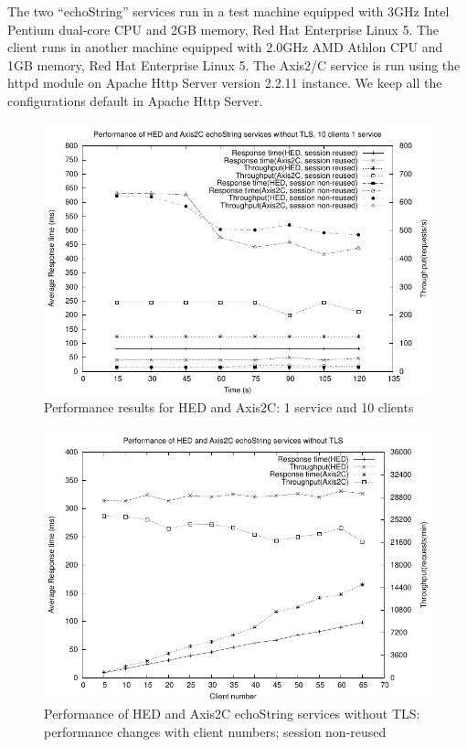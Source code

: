 \documentclass[conference]{IEEEtran}
\begin{document}
The two ``echoString'' services run in a test machine equipped with 3GHz Intel Pentium dual-core 
CPU and 2GB memory, Red Hat Enterprise Linux 5. The client runs in another machine equipped 
with 2.0GHz AMD Athlon CPU and 1GB memory, Red Hat Enterprise Linux 5. The Axis2/C service is run using 
the httpd module on Apache Http Server version 2.2.11 instance. We keep all the configurations 
default in Apache Http Server.

\begin{figure}
\includegraphics[width=0.9\columnwidth]{HED2Axis_thread10.pdf}
\caption{Performance results for HED and Axis2C: 1 service and 10 clients}
\label{fig:HED2Axis_thread10}
\end{figure}

\begin{figure}
\includegraphics[width=0.9\columnwidth]{TCP_thread_all.pdf}
\caption{Performance of HED and Axis2C echoString services without TLS: performance
changes with client numbers; session non-reused }
\label{fig:TCP_thread_all}
\end{figure}
\end{document}
